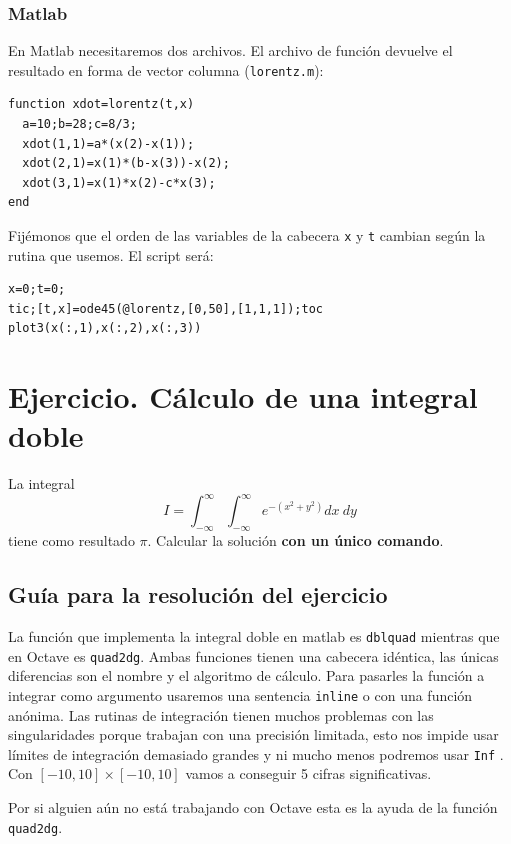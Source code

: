 \subsubsection{Matlab}

En Matlab necesitaremos dos archivos. El archivo de función devuelve
el resultado en forma de vector columna (\texttt{lorentz.m}):

  \begin{verbatim}
function xdot=lorentz(t,x)
  a=10;b=28;c=8/3;
  xdot(1,1)=a*(x(2)-x(1));
  xdot(2,1)=x(1)*(b-x(3))-x(2);
  xdot(3,1)=x(1)*x(2)-c*x(3);
end
 \end{verbatim}
Fijémonos que el orden de las variables de la cabecera \texttt{x}
y \texttt{t} cambian según la rutina que usemos. El script será:

  \begin{verbatim}
x=0;t=0;
tic;[t,x]=ode45(@lorentz,[0,50],[1,1,1]);toc
plot3(x(:,1),x(:,2),x(:,3))
 \end{verbatim}

\section{Ejercicio.  Cálculo de una integral doble}

La integral
$$I=\int_{-\infty}^{\infty}\int_{-\infty}^{\infty}e^{-(x^{2}+y^{2})}dx\  dy$$
tiene como resultado $\pi$. Calcular la solución \textbf{con un único
comando}.


\subsection{Guía para la resolución del ejercicio}

La función que implementa la integral doble en matlab es \texttt{dblquad}
mientras que en Octave es \texttt{quad2dg}. Ambas funciones tienen
una cabecera idéntica, las únicas diferencias son el nombre y el algoritmo
de cálculo. Para pasarles la función a integrar como argumento usaremos
una sentencia \texttt{inline} o con una función anónima. Las rutinas
de integración tienen muchos problemas con las singularidades porque
trabajan con una precisión limitada, esto nos impide usar límites
de integración demasiado grandes y ni mucho menos podremos usar \texttt{Inf}
. Con $[-10,10]\times[-10,10]$ vamos a conseguir 5 cifras significativas.

Por si alguien aún no está trabajando con Octave esta es la ayuda
de la función \texttt{quad2dg}.

